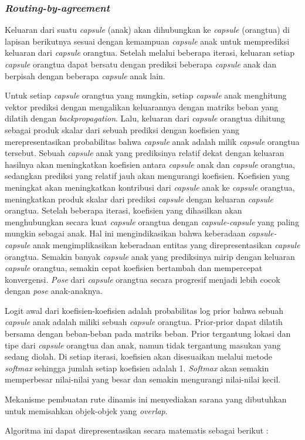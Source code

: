 \documentclass{article}
\begin{document}
	   	\subsubsection{\textit{Routing-by-agreement}}
	   	Keluaran dari suatu \textit{capsule} (anak) akan dihubungkan ke \textit{capsule} (orangtua) di lapisan berikutnya sesuai dengan kemampuan \textit{capsule} anak untuk memprediksi keluaran dari \textit{capsule} orangtua. Setelah melalui beberapa iterasi, keluaran setiap \textit{capsule} orangtua dapat bersatu dengan prediksi beberapa \textit{capsule} anak dan berpisah dengan beberapa \textit{capsule} anak lain. 
	   	\par
	   	Untuk setiap \textit{capsule} orangtua yang mungkin, setiap \textit{capsule} anak menghitung vektor prediksi dengan mengalikan keluarannya dengan matriks beban yang dilatih dengan \textit{backpropagation}. Lalu, keluaran dari \textit{capsule} orangtua dihitung sebagai produk skalar dari sebuah prediksi dengan koefisien yang merepresentasikan probabilitas bahwa \textit{capsule} anak  adalah milik \textit{capsule} orangtua tersebut. Sebuah \textit{capsule} anak yang prediksinya relatif dekat dengan keluaran hasilnya akan meningkatkan koefisien antara \textit{capsule} anak dan \textit{capsule} orangtua, sedangkan prediksi yang relatif jauh akan mengurangi koefisien. Koefisien yang meningkat akan meningkatkan kontribusi dari \textit{capsule} anak ke \textit{capsule} orangtua, meningkatkan produk skalar dari prediksi \textit{capsule} dengan keluaran \textit{capsule} orangtua. Setelah beberapa iterasi, koefisien yang dihasilkan akan menghubungkan secara kuat \textit{capsule} orangtua dengan \textit{capsule-capsule} yang paling mungkin sebagai anak. Hal ini mengindikasikan bahwa keberadaan \textit{capsule-capsule} anak mengimplikasikan keberadaan entitas yang direpresentasikan \textit{capsule} orangtua. Semakin banyak \textit{capsule} anak yang prediksinya mirip dengan keluaran \textit{capsule} orangtua, semakin cepat koefisien bertambah dan mempercepat konvergensi. \textit{Pose} dari \textit{capsule} orangtua secara progresif menjadi lebih cocok dengan \textit{pose} anak-anaknya. 
	   	\par
	   	Logit awal dari koefisien-koefisien adalah probabilitas log prior bahwa sebuah \textit{capsule} anak adalah miliki sebuah \textit{capsule} orangtua. Prior-prior dapat dilatih bersama dengan beban-beban pada matriks beban. Prior tergantung lokasi dan tipe dari \textit{capsule} orangtua dan anak, namun tidak tergantung masukan yang sedang diolah. Di setiap iterasi, koefisien akan disesuaikan melalui metode \textit{softmax} sehingga jumlah setiap koefisien adalah 1. \textit{Softmax} akan semakin memperbesar nilai-nilai yang besar dan semakin mengurangi nilai-nilai kecil.
	   	\par
	   	Mekanisme pembuatan rute dinamis ini menyediakan sarana yang dibutuhkan untuk memisahkan objek-objek yang \textit{overlap}. 
	   	\par 
	   	Algoritma ini dapat direpresentasikan secara matematis sebagai berikut : 
	   	
\end{document}
